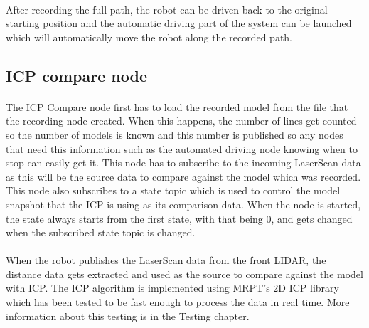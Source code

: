 \paragraph{}
After recording the full path, the robot can be driven back to the original starting position and the automatic driving part of the system can be launched which will automatically move the robot along the recorded path.


\subsection{ICP compare node}
\paragraph{}
The ICP Compare node first has to load the recorded model from the file that the recording node created. When this happens, the number of lines get counted so the number of models is known and this number is published so any nodes that need this information such as the automated driving node knowing when to stop can easily get it. This node has to subscribe to the incoming LaserScan data as this will be the source data to compare against the model which was recorded. This node also subscribes to a state topic which is used to control the model snapshot that the ICP is using as its comparison data. When the node is started, the state always starts from the first state, with that being 0, and gets changed when the subscribed state topic is changed.
\paragraph{}
When the robot publishes the LaserScan data from the front LIDAR, the distance data gets extracted and used as the source to compare against the model with ICP. The ICP algorithm is implemented using MRPT's 2D ICP library which has been tested to be fast enough to process the data in real time. More information about this testing is in the Testing chapter.
